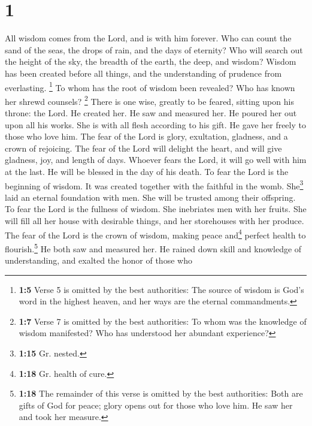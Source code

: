\hypertarget{section}{%
\section{1}\label{section}}

 All wisdom comes from the Lord, and is with him forever.
 Who can count the sand of the seas, the drops of rain,
and the days of eternity?  Who will search out the height
of the sky, the breadth of the earth, the deep, and wisdom?
 Wisdom has been created before all things, and the
understanding of prudence from everlasting.  \footnote{\textbf{1:5}
  Verse 5 is omitted by the best authorities: The source of wisdom is
  God's word in the highest heaven, and her ways are the eternal
  commandments.}  To whom has the root of wisdom been
revealed? Who has known her shrewd counsels?  \footnote{\textbf{1:7}
  Verse 7 is omitted by the best authorities: To whom was the knowledge
  of wisdom manifested? Who has understood her abundant experience?}
 There is one wise, greatly to be feared, sitting upon his
throne: the Lord.  He created her. He saw and measured
her. He poured her out upon all his works.  She is with
all flesh according to his gift. He gave her freely to those who love
him.  The fear of the Lord is glory, exultation,
gladness, and a crown of rejoicing.  The fear of the Lord
will delight the heart, and will give gladness, joy, and length of days.
 Whoever fears the Lord, it will go well with him at the
last. He will be blessed in the day of his death.  To
fear the Lord is the beginning of wisdom. It was created together with
the faithful in the womb.  She\footnote{\textbf{1:15} Gr.
  nested.} laid an eternal foundation with men. She will be trusted
among their offspring.  To fear the Lord is the fullness
of wisdom. She inebriates men with her fruits.  She will
fill all her house with desirable things, and her storehouses with her
produce.  The fear of the Lord is the crown of wisdom,
making peace and\footnote{\textbf{1:18} Gr. health of cure.} perfect
health to flourish.\footnote{\textbf{1:18} The remainder of this verse
  is omitted by the best authorities: Both are gifts of God for peace;
  glory opens out for those who love him. He saw her and took her
  measure.}  He both saw and measured her. He rained down
skill and knowledge of understanding, and exalted the honor of those who
